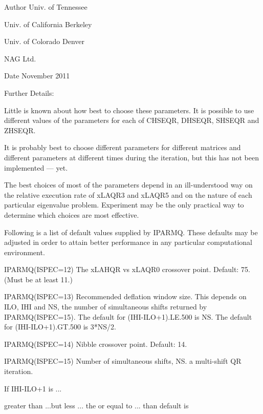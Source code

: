 \begin{DoxyAuthor}{Author}
Univ. of Tennessee 

Univ. of California Berkeley 

Univ. of Colorado Denver 

N\+A\+G Ltd. 
\end{DoxyAuthor}
\begin{DoxyDate}{Date}
November 2011 
\end{DoxyDate}
\begin{DoxyParagraph}{Further Details\+: }
\begin{DoxyVerb}       Little is known about how best to choose these parameters.
       It is possible to use different values of the parameters
       for each of CHSEQR, DHSEQR, SHSEQR and ZHSEQR.

       It is probably best to choose different parameters for
       different matrices and different parameters at different
       times during the iteration, but this has not been
       implemented --- yet.


       The best choices of most of the parameters depend
       in an ill-understood way on the relative execution
       rate of xLAQR3 and xLAQR5 and on the nature of each
       particular eigenvalue problem.  Experiment may be the
       only practical way to determine which choices are most
       effective.

       Following is a list of default values supplied by IPARMQ.
       These defaults may be adjusted in order to attain better
       performance in any particular computational environment.

       IPARMQ(ISPEC=12) The xLAHQR vs xLAQR0 crossover point.
                        Default: 75. (Must be at least 11.)

       IPARMQ(ISPEC=13) Recommended deflation window size.
                        This depends on ILO, IHI and NS, the
                        number of simultaneous shifts returned
                        by IPARMQ(ISPEC=15).  The default for
                        (IHI-ILO+1).LE.500 is NS.  The default
                        for (IHI-ILO+1).GT.500 is 3*NS/2.

       IPARMQ(ISPEC=14) Nibble crossover point.  Default: 14.

       IPARMQ(ISPEC=15) Number of simultaneous shifts, NS.
                        a multi-shift QR iteration.

                        If IHI-ILO+1 is ...

                        greater than      ...but less    ... the
                        or equal to ...      than        default is


\end{DoxyVerb}
\end{DoxyParagraph}
